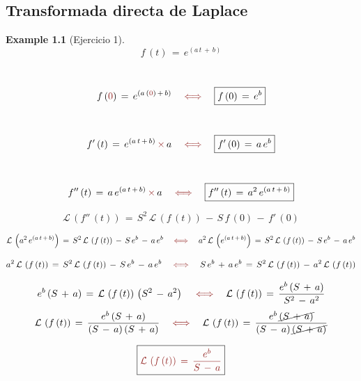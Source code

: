 \documentclass[a4paper,11pt,openany]{book}
\newtheorem{exmp}{Example}[section]
\begin{document}
\tableofcontents
 
 
\textcolor{amber(sae/ece)}{\chapter{Transformada directa de Laplace}} 
 
\begin{exmp}[Ejercicio 1]
 
 
$$f\,(t)\,=\,e^{(a\,t\,+\,b)}$$
 
\textcolor{vividauburn}{}\, $$f\,(\textcolor{vividauburn}{0})\,=\,e^{(a\,(\textcolor{vividauburn}{0})\,+\,b)} \quad \textcolor{vividauburn}{\iff} \quad \boxed{f\,(0)\,=\,e^{b}}$$
 
\textcolor{vividauburn}{}\, $$f'\,(t)\,=\,e^{(a\,t\,+\,b)}\,\textcolor{vividauburn}{\times}\,a \quad \textcolor{vividauburn}{\iff} \quad \boxed{f'\,(0)\,=\,a\,e^{b}}$$
 
\textcolor{vividauburn}{}\, $$f''\,(t)\,=\,a\,e^{(a\,t\,+\,b)}\,\textcolor{vividauburn}{\times}\,a \quad \textcolor{vividauburn}{\iff} \quad \boxed{f''\,(t)\,=\,a^{2}\,e^{(a\,t\,+\,b)} }$$
 
$$\boxed{\mathcal{L}\,\left(f''\,(t) \right)\,=\,S^{2}\,\mathcal{L}\,\left(f\,(t) \right)\,-\,S\,f\,(0)\,-\,f'\,(0)}$$
 
$$\mathcal{L}\,\left(a^{2}\,e^{(a\,t\,+\,b)} \right)\,=\,S^{2}\,\mathcal{L}\,\left(f\,(t) \right)\,-\,S\,e^{b}\,-\,a\,e^{b} \quad \textcolor{vividauburn}{\iff} \quad a^{2}\,\mathcal{L}\,\left(e^{(a\,t\,+\,b)} \right)\,=\,S^{2}\,\mathcal{L}\,\left(f\,(t) \right)\,-\,S\,e^{b}\,-\,a\,e^{b} $$
 
$$a^{2}\,\mathcal{L}\,\left(f\,(t) \right)\,=\,S^{2}\,\mathcal{L}\,\left(f\,(t) \right)\,-\,S\,e^{b}\,-\,a\,e^{b} \quad \textcolor{vividauburn}{\iff} \quad S\,e^{b}\,+\,a\,e^{b}\,=\,S^{2}\,\mathcal{L}\,\left(f\,(t) \right)\,-\,a^{2}\,\mathcal{L}\,\left(f\,(t) \right)$$
 
$$e^{b}\,(S\,+\,a)\,=\,\mathcal{L}\,\left(f\,(t) \right)\,\left(S^{2}\,-\,a^{2}  \right) \quad \textcolor{vividauburn}{\iff} \quad \mathcal{L}\,\left(f\,(t) \right)\,=\,\dfrac{e^{b}\,(S\,+\,a)}{S^{2}\,-\,a^{2}} $$ 
$$\mathcal{L}\,\left(f\,(t) \right)\,=\,\dfrac{e^{b}\,(S\,+\,a)}{(S\,-\,a)\,(S\,+\,a) } \quad \textcolor{vividauburn}{\iff} \quad \mathcal{L}\,\left(f\,(t) \right)\,=\,\dfrac{e^{b}\,\cancel{(S\,+\,a)}}{(S\,-\,a)\,\cancel{(S\,+\,a)} }$$
 
$$\boxed{\textcolor{vividauburn}{\mathcal{L}\,\left(f\,(t) \right)\,=\,\dfrac{e^{b} }{S\,-\,a} } } $$
 
\end{exmp}
 
\end{document}
